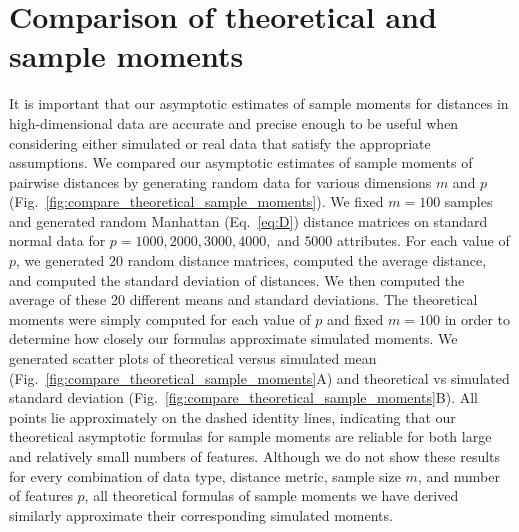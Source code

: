 \documentclass[aoas]{imsart}
\begin{document}
\section{Comparison of theoretical and sample moments}

It is important that our asymptotic estimates of sample moments for distances in high-dimensional data are accurate and precise enough to be useful when considering either simulated or real data that satisfy the appropriate assumptions. We compared our asymptotic estimates of sample moments of pairwise distances by generating random data for various dimensions $m$ and $p$ (Fig.~\ref{fig:compare_theoretical_sample_moments}). We fixed $m=100$ samples and generated random Manhattan (Eq.~\ref{eq:D}) distance matrices on standard normal data for $p=1000,2000,3000,4000,$ and $5000$ attributes. For each value of $p$, we generated 20 random distance matrices, computed the average distance, and computed the standard deviation of distances. We then computed the average of these 20 different means and standard deviations. The theoretical moments were simply computed for each value of $p$ and fixed $m=100$ in order to determine how closely our formulas approximate simulated moments. We generated scatter plots of theoretical versus simulated mean (Fig.~\ref{fig:compare_theoretical_sample_moments}A) and theoretical vs simulated standard deviation (Fig.~\ref{fig:compare_theoretical_sample_moments}B). All points lie approximately on the dashed identity lines, indicating that our theoretical asymptotic formulas for sample moments are reliable for both large and relatively small numbers of features. Although we do not show these results for every combination of data type, distance metric, sample size $m$, and number of features $p$, all theoretical formulas of sample moments we have derived similarly approximate their corresponding simulated moments.
\end{document}
